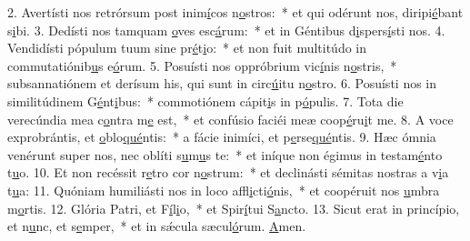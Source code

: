 2. Avertísti nos retrórsum post inim\uline{í}cos n\uline{o}stros:~* et qui odérunt nos, diripi\uline{é}bant s\uline{i}bi.
3. Dedísti nos tamquam \uline{o}ves esc\uline{á}rum:~* et in Géntibus d\uline{i}spers\uline{í}sti nos.
4. Vendidísti pópulum tuum sine pr\uline{é}t\uline{i}o:~* et non fuit multitúdo in commutatiónib\uline{u}s e\uline{ó}rum.
5. Posuísti nos oppróbrium vic\uline{í}nis n\uline{o}stris,~* subsannatiónem et derísum his, qui sunt in circ\uline{ú}itu n\uline{o}stro.
6. Posuísti nos in similitúdinem G\uline{é}nt\uline{i}bus:~* commotiónem cápit\uline{i}s in p\uline{ó}pulis.
7. Tota die verecúndia mea c\uline{o}ntra m\uline{e} est,~* et confúsio faciéi meæ coop\uline{é}ru\uline{i}t me.
8. A voce exprobrántis, et \uline{o}blo\uline{qué}ntis:~* a fácie inimíci, et p\uline{e}rse\uline{qué}ntis.
9. Hæc ómnia venérunt super nos, nec oblíti s\uline{u}m\uline{u}s te:~* et iníque non égimus in testam\uline{é}nto t\uline{u}o.
10. Et non recéssit r\uline{e}tro cor n\uline{o}strum:~* et declinásti sémitas nostras a v\uline{i}a t\uline{u}a:
11. Quóniam humiliásti nos in loco affl\uline{i}cti\uline{ó}nis,~* et coopéruit nos \uline{u}mbra m\uline{o}rtis.
12. Glória Patri, et F\uline{í}l\uline{i}o,~* et Spir\uline{í}tui S\uline{a}ncto.
13. Sicut erat in princípio, et n\uline{u}nc, et s\uline{e}mper,~* et in sǽcula sæcul\uline{ó}rum. \uline{A}men.
